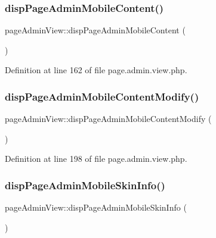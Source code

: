\subsubsection{\texorpdfstring{disp\+Page\+Admin\+Mobile\+Content()}{dispPageAdminMobileContent()}}
{\footnotesize\ttfamily page\+Admin\+View\+::disp\+Page\+Admin\+Mobile\+Content (\begin{DoxyParamCaption}{ }\end{DoxyParamCaption})}



Definition at line 162 of file page.\+admin.\+view.\+php.

\hypertarget{classpageAdminView_a71e87e225509a1c4e761ecc57852c5f5}{}\label{classpageAdminView_a71e87e225509a1c4e761ecc57852c5f5} 
\subsubsection{\texorpdfstring{disp\+Page\+Admin\+Mobile\+Content\+Modify()}{dispPageAdminMobileContentModify()}}
{\footnotesize\ttfamily page\+Admin\+View\+::disp\+Page\+Admin\+Mobile\+Content\+Modify (\begin{DoxyParamCaption}{ }\end{DoxyParamCaption})}



Definition at line 198 of file page.\+admin.\+view.\+php.

\hypertarget{classpageAdminView_a04fa424a6f0dabc81b6a4ab4c32a53b8}{}\label{classpageAdminView_a04fa424a6f0dabc81b6a4ab4c32a53b8} 
\subsubsection{\texorpdfstring{disp\+Page\+Admin\+Mobile\+Skin\+Info()}{dispPageAdminMobileSkinInfo()}}
{\footnotesize\ttfamily page\+Admin\+View\+::disp\+Page\+Admin\+Mobile\+Skin\+Info (\begin{DoxyParamCaption}{ }\end{DoxyParamCaption})}

